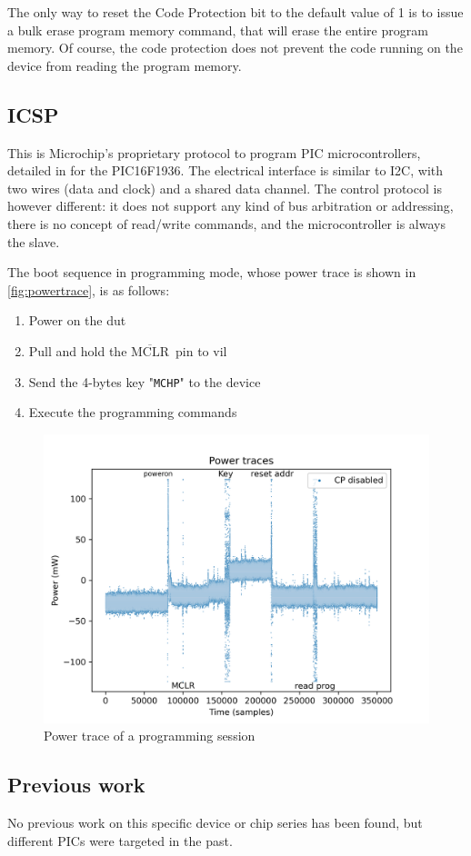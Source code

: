 \documentclass[a4paper,english,twoside,10pt]{article}
\newcommand{\mclr}{\(\overline{\mbox{MCLR}}\)\ }
\begin{document}
The only way to reset the Code Protection bit to the default value of 1 is to issue a bulk erase program memory command, that will erase the entire program memory. Of course, the code protection does not prevent the code running on the device from reading the program memory.

\subsection{ICSP}
This is Microchip's proprietary protocol to program PIC microcontrollers, detailed in \cite{microchip:DS41397B} for the PIC16F1936. The electrical interface is similar to I2C, with two wires (data and clock) and a shared data channel. The control protocol is however different: it does not support any kind of bus arbitration or addressing, there is no concept of read/write commands, and the microcontroller is always the slave.

The boot sequence in programming mode, whose power trace is shown in \autoref{fig:powertrace}, is as follows:
\begin{enumerate}
	\item Power on the \gls{dut}
	\item Pull and hold the \mclr pin to \gls{vil}
	\item Send the 4-bytes key "\texttt{MCHP}" to the device
	\item Execute the programming commands
\end{enumerate}

\begin{figure}[htbp]
	\centering%
	\includegraphics[width=.75\textwidth]{seaborn_power_trace.png}
	\caption{Power trace of a programming session}
	\label{fig:powertrace}
\end{figure}

\subsection{Previous work}
No previous work on this specific device or chip series has been found, but different PICs were targeted in the past.
\end{document}
